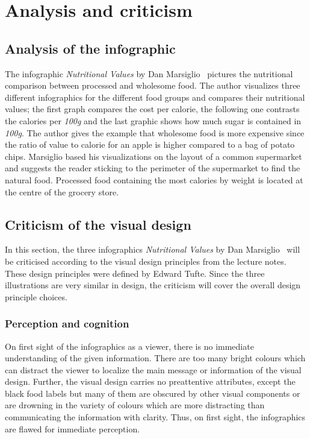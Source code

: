 \section{Analysis and criticism}

\subsection{Analysis of the infographic}

The infographic \textit{Nutritional Values} by Dan
Marsiglio~\cite{DanMarsiglio2008} pictures the nutritional comparison between
processed and wholesome food. The author visualizes three different infographics
for the different food groups and compares their nutritional values; the first
graph compares the cost per calorie, the following one contrasts the calories
per \textit{100g} and the last graphic shows how much sugar is contained in
\textit{100g}. The author gives the example that wholesome food is more
expensive since the ratio of value to calorie for an apple is higher compared to
a bag of potato chips. Marsiglio based his visualizations on the layout of a
common supermarket and suggests the reader sticking to the perimeter of the
supermarket to find the natural food.  Processed food containing the most
calories by weight is located at the centre of the grocery store.

\subsection{Criticism of the visual design}

In this section, the three infographics \textit{Nutritional Values} by Dan
Marsiglio~\cite{DanMarsiglio2008} will be criticised according to the visual
design principles from the lecture notes. These design principles were defined
by Edward Tufte\cite{Tufte2001}. Since the three illustrations are very similar
in design, the criticism will cover the overall design principle choices.

\subsubsection{Perception and cognition}

On first sight of the infographics as a viewer, there is no immediate
understanding of the given information. There are too many bright colours which
can distract the viewer to localize the main message or information of the
visual design. Further, the visual design carries no preattentive attributes,
except the black food labels but many of them are obscured by other visual
components or are drowning in the variety of colours which are more distracting
than communicating the information with clarity. Thus, on first sight, the
infographics are flawed for immediate perception.

